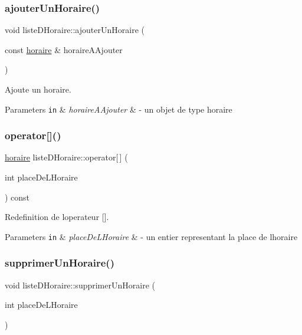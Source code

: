 \subsubsection{\texorpdfstring{ajouter\+Un\+Horaire()}{ajouterUnHoraire()}}
{\footnotesize\ttfamily void liste\+D\+Horaire\+::ajouter\+Un\+Horaire (\begin{DoxyParamCaption}\item[{const \hyperlink{classhoraire}{horaire} \&}]{horaire\+A\+Ajouter }\end{DoxyParamCaption})}



Ajoute un horaire. 


\begin{DoxyParams}[1]{Parameters}
\mbox{\tt in}  & {\em horaire\+A\+Ajouter} & -\/ un objet de type horaire \\
\hline
\end{DoxyParams}
\hypertarget{classliste_d_horaire_a23b08c00c1d32405bd84045ca9b6208a}{}\label{classliste_d_horaire_a23b08c00c1d32405bd84045ca9b6208a} 
\subsubsection{\texorpdfstring{operator[]()}{operator[]()}}
{\footnotesize\ttfamily \hyperlink{classhoraire}{horaire} liste\+D\+Horaire\+::operator\mbox{[}$\,$\mbox{]} (\begin{DoxyParamCaption}\item[{int}]{place\+De\+L\+Horaire }\end{DoxyParamCaption}) const}



Redefinition de l\textquotesingle{}operateur \mbox{[}\mbox{]}. 


\begin{DoxyParams}[1]{Parameters}
\mbox{\tt in}  & {\em place\+De\+L\+Horaire} & -\/ un entier representant la place de l\textquotesingle{}horaire \\
\hline
\end{DoxyParams}
\hypertarget{classliste_d_horaire_ad7e5d53b1c64285c908f9fe2e60aa61f}{}\label{classliste_d_horaire_ad7e5d53b1c64285c908f9fe2e60aa61f} 
\subsubsection{\texorpdfstring{supprimer\+Un\+Horaire()}{supprimerUnHoraire()}}
{\footnotesize\ttfamily void liste\+D\+Horaire\+::supprimer\+Un\+Horaire (\begin{DoxyParamCaption}\item[{int}]{place\+De\+L\+Horaire }\end{DoxyParamCaption})}



